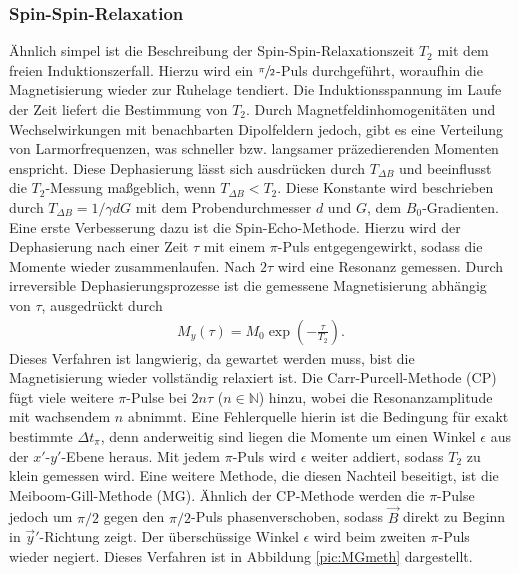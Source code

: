 \subsubsection{Spin-Spin-Relaxation}
Ähnlich simpel ist die Beschreibung der Spin-Spin-Relaxationszeit $T_2$ mit dem freien Induktionszerfall. Hierzu wird ein $\sfrac{\pi}{2}$-Puls
durchgeführt, woraufhin die Magnetisierung wieder zur Ruhelage tendiert. Die Induktionsspannung im Laufe der Zeit liefert die Bestimmung von $T_2$.
Durch Magnetfeldinhomogenitäten und Wechselwirkungen mit benachbarten Dipolfeldern jedoch, gibt es eine Verteilung von Larmorfrequenzen, was 
schneller bzw. langsamer präzedierenden Momenten enspricht. Diese Dephasierung lässt sich ausdrücken durch $T_{\Delta B}$ und beeinflusst
die $T_2$-Messung maßgeblich, wenn $T_{\Delta B} < T_2$. Diese Konstante wird beschrieben durch $T_{\Delta B} = 1/\gamma d G$ mit dem 
Probendurchmesser $d$ und $G$, dem $B_0$-Gradienten.\\
\noindent Eine erste Verbesserung dazu ist die Spin-Echo-Methode. Hierzu wird der Dephasierung nach einer Zeit $\tau $ mit einem $\pi$-Puls 
entgegengewirkt, sodass die Momente wieder zusammenlaufen. Nach $2\tau$ wird eine Resonanz gemessen. Durch irreversible Dephasierungsprozesse
ist die gemessene Magnetisierung abhängig von $\tau$, ausgedrückt durch
\begin{align}
 M_y(\tau) = M_0\exp\left(-\frac{\tau}{T_2} \right).
 \label{eq:My}
\end{align}
Dieses Verfahren ist langwierig, da gewartet werden muss, bist die Magnetisierung wieder vollständig relaxiert ist. Die Carr-Purcell-Methode (CP)
fügt viele weitere $\pi$-Pulse bei $2n\tau$ ($n\in\mathbb{N}$) hinzu, wobei die Resonanzamplitude mit wachsendem $n$ abnimmt. Eine Fehlerquelle
hierin ist die Bedingung für exakt bestimmte $\Delta t_{\pi}$, denn anderweitig sind liegen die Momente um einen Winkel $\epsilon$ aus der 
$x'$-$y'$-Ebene heraus. Mit jedem $\pi$-Puls wird $\epsilon$ weiter addiert, sodass $T_2$ zu klein gemessen wird. Eine weitere Methode, die 
diesen Nachteil beseitigt, ist die Meiboom-Gill-Methode (MG). Ähnlich der CP-Methode werden die $\pi$-Pulse jedoch um $\pi/2$ gegen den 
$\pi/2$-Puls phasenverschoben, sodass $\vec B$ direkt zu Beginn in $\vec y'$-Richtung zeigt. Der überschüssige Winkel $\epsilon$ wird beim
zweiten $\pi$-Puls wieder negiert. Dieses Verfahren ist in Abbildung \ref{pic:MGmeth} dargestellt.
